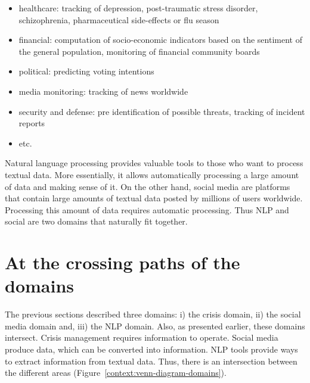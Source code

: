 \begin{itemize}
    \item healthcare: tracking of depression, post-traumatic stress disorder, schizophrenia, pharmaceutical side-effects or flu season
    \item financial: computation of socio-economic indicators based on the sentiment of the general population, monitoring of financial community boards
    \item political: predicting voting intentions
    \item media monitoring: tracking of news worldwide
    \item security and defense: pre identification of possible threats, tracking of incident reports
    \item etc.
\end{itemize}

Natural language processing provides valuable tools to those who want to process textual data.
More essentially, it allows automatically processing a large amount of data and making sense of it.
On the other hand, social media are platforms that contain large amounts of textual data posted by millions of users worldwide.
Processing this amount of data requires automatic processing.
Thus NLP and social are two domains that naturally fit together.

\section{At the crossing paths of the domains}
\label{sec:academic-domains}
The previous sections described three domains: i) the crisis domain, ii) the social media domain and, iii) the NLP domain.
Also, as presented earlier, these domains intersect.
Crisis management requires information to operate.
Social media produce data, which can be converted into information.
NLP tools provide ways to extract information from textual data.
Thus, there is an intersection between the different areas (Figure~\ref{context:venn-diagram-domains}).

